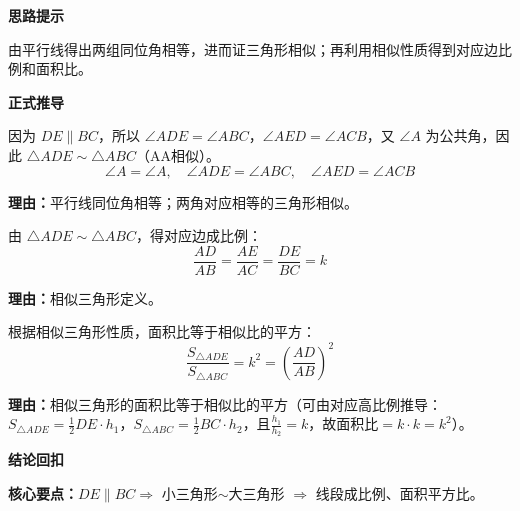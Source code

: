 \begin{proofbox}

	\textbf{\textcolor{CProof}{思路提示}}

	由平行线得出两组同位角相等，进而证三角形相似；再利用相似性质得到对应边比例和面积比。

	\medskip
	\textbf{\textcolor{CProof}{正式推导}}
	\begin{description}[style=nextline, leftmargin=2.8em, labelsep=0.5em, itemsep=0.55em]
		\item[\textbf{步骤一（证角等）：}] 因为 $DE\parallel BC$，所以 $\angle ADE = \angle ABC$，$\angle AED = \angle ACB$，又 $\angle A$ 为公共角，因此 $\triangle ADE \sim \triangle ABC$（AA相似）。
			\[
				\angle A = \angle A,\quad \angle ADE = \angle ABC,\quad \angle AED = \angle ACB
			\]
			\par\textbf{理由：}平行线同位角相等；两角对应相等的三角形相似。

		\item[\textbf{步骤二（定比例）：}] 由 $\triangle ADE \sim \triangle ABC$，得对应边成比例：
			\[
				\frac{AD}{AB} = \frac{AE}{AC} = \frac{DE}{BC} = k
			\]
			\par\textbf{理由：}相似三角形定义。

		\item[\textbf{步骤三（面积比）：}] 根据相似三角形性质，面积比等于相似比的平方：
			\[
				\frac{S_{\triangle ADE}}{S_{\triangle ABC}} = k^2 = \left(\frac{AD}{AB}\right)^2
			\]
			\par\textbf{理由：}相似三角形的面积比等于相似比的平方（可由对应高比例推导：$S_{\triangle ADE}=\frac12 DE\cdot h_1$，$S_{\triangle ABC}=\frac12 BC\cdot h_2$，且$\frac{h_1}{h_2}=k$，故面积比$=k\cdot k=k^2$）。
	\end{description}

	\medskip
	\textbf{\textcolor{CProof}{结论回扣}}

	\textbf{核心要点：}$DE\parallel BC \Rightarrow$ 小三角形$\sim$大三角形 $\Rightarrow$ 线段成比例、面积平方比。
\end{proofbox}
